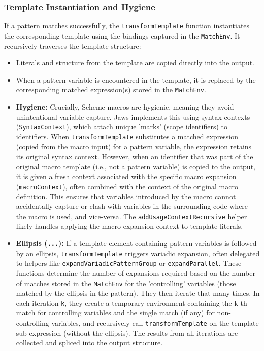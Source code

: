 \documentclass[final]{cmpreport_02}
\begin{document}
\subsubsection{Template Instantiation and Hygiene}
If a pattern matches successfully, the \texttt{transformTemplate} function instantiates the corresponding template using the bindings captured in the \texttt{MatchEnv}. It recursively traverses the template structure:
\begin{itemize}
    \item Literals and structure from the template are copied directly into the output.
    \item When a pattern variable is encountered in the template, it is replaced by the corresponding matched expression(s) stored in the \texttt{MatchEnv}.
    \item \textbf{Hygiene:} Crucially, Scheme macros are hygienic, meaning they avoid unintentional variable capture. Jaws implements this using syntax contexts (\texttt{SyntaxContext}), which attach unique 'marks' (scope identifiers) to identifiers. When \texttt{transformTemplate} substitutes a matched expression (copied from the macro input) for a pattern variable, the expression retains its original syntax context. However, when an identifier that was part of the original macro template (i.e., not a pattern variable) is copied to the output, it is given a fresh context associated with the specific macro expansion (\texttt{macroContext}), often combined with the context of the original macro definition. This ensures that variables introduced by the macro cannot accidentally capture or clash with variables in the surrounding code where the macro is used, and vice-versa. The \texttt{addUsageContextRecursive} helper likely handles applying the macro expansion context to template literals.
    \item \textbf{Ellipsis (\texttt{...}):} If a template element containing pattern variables is followed by an ellipsis, \texttt{transformTemplate} triggers variadic expansion, often delegated to helpers like \texttt{expandVariadicPatternGroup} or \texttt{expandParallel}. These functions determine the number of expansions required based on the number of matches stored in the \texttt{MatchEnv} for the 'controlling' variables (those matched by the ellipsis in the pattern). They then iterate that many times. In each iteration \texttt{k}, they create a temporary environment containing the k-th match for controlling variables and the single match (if any) for non-controlling variables, and recursively call \texttt{transformTemplate} on the template sub-expression (without the ellipsis). The results from all iterations are collected and spliced into the output structure.
\end{itemize}
\end{document}
